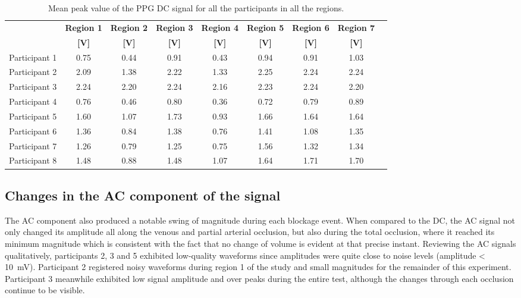 \begin{table}[!htbp]
	\caption[Mean peak value of the PPG DC signal for all participants in all regions]{Mean peak value of the PPG DC signal for all the participants in all the regions.}
	\label{tbl:PPG RED-DC}
	\centering \small
	\begin{tabular}{p{1.9cm}cccccccc}
		\toprule
		& \textbf{Region 1}
		& \textbf{Region 2}
		& \textbf{Region 3}
		& \textbf{Region 4}
		& \textbf{Region 5}
		& \textbf{Region 6}
		& \textbf{Region 7} \\
		& \textbf{[\si{\volt}]}
		& \textbf{[\si{\volt}]}
		& \textbf{[\si{\volt}]}		
		& \textbf{[\si{\volt}]}		
		& \textbf{[\si{\volt}]}
		& \textbf{[\si{\volt}]}
		& \textbf{[\si{\volt}]}\\\midrule
		Participant 1 & 0.75 & 0.44 & 0.91 & 0.43 & 0.94 & 0.91 & 1.03 \\  
		Participant 2 & 2.09 & 1.38 & 2.22 & 1.33 & 2.25 & 2.24 & 2.24 \\  
		Participant 3 & 2.24 & 2.20 & 2.24 & 2.16 & 2.23 & 2.24 & 2.20 \\  
		Participant 4 & 0.76 & 0.46 & 0.80 & 0.36 & 0.72 & 0.79 & 0.89 \\  
		Participant 5 & 1.60 & 1.07 & 1.73 & 0.93 & 1.66 & 1.64 & 1.64 \\  
		Participant 6 & 1.36 & 0.84 & 1.38 & 0.76 & 1.41 & 1.08 & 1.35 \\  
		Participant 7 & 1.26 & 0.79 & 1.25 & 0.75 & 1.56 & 1.32 & 1.34 \\  
		Participant 8 & 1.48 & 0.88 & 1.48 & 1.07 & 1.64 & 1.71 & 1.70 \\  
		\bottomrule
	\end{tabular}
\end{table}

\subsection{Changes in the AC component of the signal}
\label{section comparison 4.2}
The AC component also produced a notable swing of magnitude during each blockage event. When compared to the DC, the AC signal not only changed its amplitude all along the venous and partial arterial occlusion, but also during the total occlusion, where it reached its minimum magnitude which is consistent with the fact that no change of volume is evident at that precise instant. Reviewing the AC signals qualitatively, participants 2, 3 and 5 exhibited low-quality waveforms since amplitudes were quite close to noise levels  (amplitude < \SI{10}{\milli\volt}). Participant 2 registered noisy waveforms during region 1 of the study and small magnitudes for the remainder of this experiment. Participant 3 meanwhile exhibited low signal amplitude and over peaks during the entire test, although the changes through each occlusion continue to be visible.

